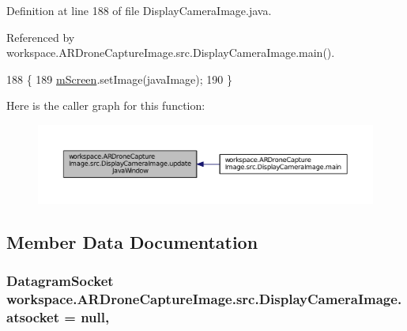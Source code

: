 Definition at line 188 of file Display\+Camera\+Image.\+java.



Referenced by workspace.\+A\+R\+Drone\+Capture\+Image.\+src.\+Display\+Camera\+Image.\+main().


\begin{DoxyCode}
188                                                                  \{
189         \hyperlink{classworkspace_1_1_a_r_drone_capture_image_1_1src_1_1_display_camera_image_a0cef26d99006f123fc8ff67021768909}{mScreen}.setImage(javaImage);
190     \}
\end{DoxyCode}


Here is the caller graph for this function\+:\nopagebreak
\begin{figure}[H]
\begin{center}
\leavevmode
\includegraphics[width=350pt]{classworkspace_1_1_a_r_drone_capture_image_1_1src_1_1_display_camera_image_abbd4c5447bc2c87cd929f1cd511d666a_icgraph}
\end{center}
\end{figure}




\subsection{Member Data Documentation}
\hypertarget{classworkspace_1_1_a_r_drone_capture_image_1_1src_1_1_display_camera_image_a51144603e1e729eb0bf4c781de6d2a13}{}
\subsubsection[{atsocket}]{\setlength{\rightskip}{0pt plus 5cm}Datagram\+Socket workspace.\+A\+R\+Drone\+Capture\+Image.\+src.\+Display\+Camera\+Image.\+atsocket = null\hspace{0.3cm}{\ttfamily [static]}, {\ttfamily [private]}}\label{classworkspace_1_1_a_r_drone_capture_image_1_1src_1_1_display_camera_image_a51144603e1e729eb0bf4c781de6d2a13}


